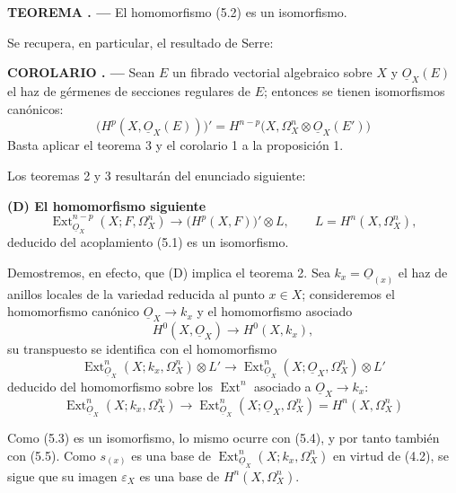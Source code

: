 \documentclass[11pt,twoside,openany]{book}
\numberwithin{equation}{section}
\newcommand{\src}[1]{%
  \phantomsection\hypertarget{src:#1}{}%
  \marginpar{\raggedleft\footnotesize\sffamily #1}%
}
\newcommand{\Osh}{\underline{O}}
\theoremstyle{plain}
\theoremstyle{definition}
\theoremstyle{remark}
\newcommand{\result}[2]{%
  \par\medskip\noindent\textbf{#1%
  \if\relax\detokenize{#2}\relax\else\space#2\fi. ---}\enspace
}
\newcommand{\FgaUnitKey}{frontmatter}
\renewcommand{\src}[1]{%
  \phantomsection\hypertarget{src:\FgaUnitKey:#1}{}%
  \marginpar{\raggedleft\footnotesize\sffamily #1}%
}
\theoremstyle{plain}
\theoremstyle{definition}
\theoremstyle{remark}
\begin{document}
\result{TEOREMA}{3} El homomorfismo (5.2) es un isomorfismo.

Se recupera, en particular, el resultado de Serre:

\result{COROLARIO}{} Sean $E$ un fibrado vectorial algebraico sobre $X$ y
$\Osh_X(E)$ el haz de gérmenes de secciones regulares de $E$; entonces se tienen
isomorfismos canónicos:
\begin{equation}\tag{5.3}
  \bigl(H^{p}(X,\Osh_X(E))\bigr)'
  =H^{n-p}\bigl(X,\Omega_X^{n}\otimes\Osh_X(E')\bigr)
\end{equation}
Basta aplicar el teorema 3 y el corolario 1 a la proposición 1.

Los teoremas 2 y 3 resultarán del enunciado siguiente:

\noindent\textbf{(D) El homomorfismo siguiente}
\begin{equation}\tag{5.2 bis}
  \operatorname{Ext}_{\Osh_X}^{n-p}(X;F,\Omega_X^{n})
  \longrightarrow\bigl(H^{p}(X,F)\bigr)'\otimes L,
  \qquad L=H^{n}(X,\Omega_X^{n}),
\end{equation}
deducido del acoplamiento (5.1) es un isomorfismo.

Demostremos, en efecto, que (D) implica el teorema 2. Sea
$k_x=\Osh_{(x)}$ el haz de anillos locales de la variedad reducida al punto
$x\in X$; consideremos el homomorfismo canónico
$\Osh_X\longrightarrow k_x$ y el homomorfismo asociado
\begin{equation}\tag{5.3}
  H^{0}(X,\Osh_X)\longrightarrow H^{0}(X,k_x),
\end{equation}
su transpuesto se identifica con el homomorfismo
\begin{equation}\tag{5.4}
  \operatorname{Ext}_{\Osh_X}^{n}(X;k_x,\Omega_X^{n})\otimes L'
  \longrightarrow
  \operatorname{Ext}_{\Osh_X}^{n}(X;\Osh_X,\Omega_X^{n})\otimes L'
\end{equation}
deducido del homomorfismo sobre los $\operatorname{Ext}^{n}$ asociado a
$\Osh_X\longrightarrow k_x$:
\begin{equation}\tag{5.5}
  \operatorname{Ext}_{\Osh_X}^{n}(X;k_x,\Omega_X^{n})
  \longrightarrow
  \operatorname{Ext}_{\Osh_X}^{n}(X;\Osh_X,\Omega_X^{n})
  =H^{n}(X,\Omega_X^{n})
\end{equation}

\src{183}
Como (5.3) es un isomorfismo, lo mismo ocurre
con (5.4), y por tanto también con (5.5). Como $s_{(x)}$ es una base de
$\operatorname{Ext}_{\Osh_X}^{n}(X;k_x,\Omega_X^{n})$ en virtud de (4.2), se
sigue que su imagen $\varepsilon_X$ es una base de
$H^{n}(X,\Omega_X^{n})$.
\end{document}
